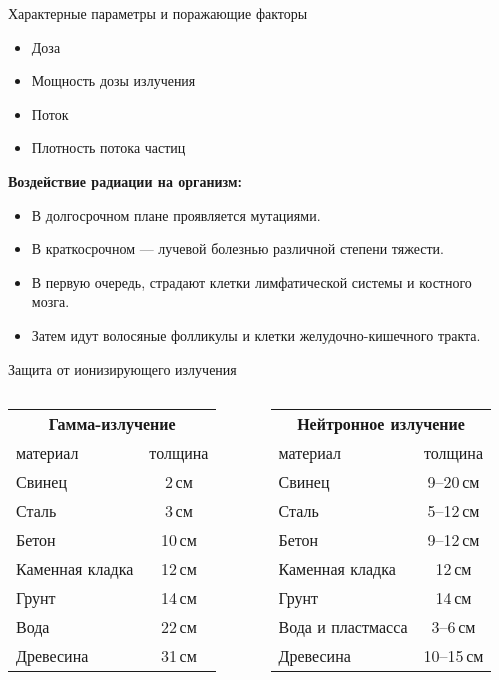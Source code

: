 \documentclass[unicode,lefteqn,c,hyperref={pdfpagelabels=false}]{beamer}
\begin{document}
\begin{frame}{Характерные параметры и поражающие факторы}
    \begin{itemize}
        \item Доза
        \item Мощность дозы излучения
        \item Поток
        \item Плотность потока частиц
    \end{itemize}
    \smallskip

    \textbf{Воздействие радиации на организм:}
    \begin{itemize}
        \item В долгосрочном плане проявляется мутациями.
        \item В краткосрочном --- лучевой болезнью различной степени тяжести.
        \item В первую очередь, страдают клетки лимфатической системы и костного мозга.
        \item Затем идут волосяные фолликулы и клетки желудочно-кишечного тракта.
    \end{itemize}
\end{frame}


\begin{frame}{Защита от ионизирующего излучения}


\begin{columns}
        \begin{tabular}{l|c}
        \multicolumn{2}{c}{\textbf{Гамма-излучение}}\\
        материал & толщина\\ 
        \hline
        Свинец & 2\,см \\
        Сталь & 3\,см \\
        Бетон & 10\,см  \\ 
        Каменная кладка & 12\,см \\
        Грунт & 14\,см \\
        Вода & 22\,см \\
        Древесина & 31\,см \\
        \end{tabular}
        \begin{tabular}{l|c}
        \multicolumn{2}{c}{\textbf{Нейтронное излучение}} \\
        материал & толщина\\ 
        \hline
        Свинец & 9--20\,см \\
        Сталь & 5--12\,см \\
        Бетон & 9--12\,см  \\
        Каменная кладка & 12\,см \\
        Грунт & 14\,см \\
        Вода и пластмасса  & 3--6\,см \\
        Древесина & 10--15\,см \\
        \end{tabular}

\end{columns}
\end{frame}
\end{document}
